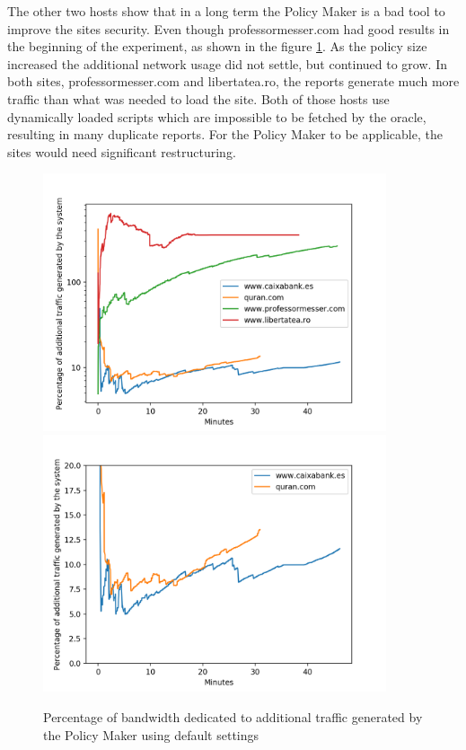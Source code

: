 The other two hosts show that in a long term the Policy Maker is a bad tool to improve the sites security.
Even though professormesser.com had good results in the beginning of the experiment, as shown in the figure \ref{fig:standarUsage}.
As the policy size increased the additional network usage did not settle, but continued to grow.
In both sites, professormesser.com and libertatea.ro, the reports generate much more traffic than what was needed to load the site.
Both of those hosts use dynamically loaded scripts which are impossible to be fetched by the oracle, resulting in many duplicate reports.
For the Policy Maker to be applicable, the sites would need significant restructuring.
\newpage
\begin{figure}[H]
	\centering
	\includegraphics[width=0.9\textwidth]{imgs/netword_usage_plot.png}
	\includegraphics[width=0.9\textwidth]{imgs/netword_usage_long_plot.png}
	\caption{Percentage of bandwidth dedicated to additional traffic generated by the Policy Maker using default settings}
	\label{fig:standarUsage}
\end{figure}

